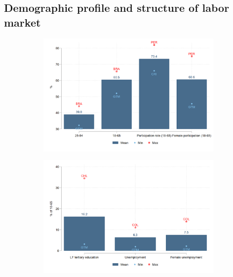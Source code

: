 \documentclass[english]{article}
\begin{document}
\subsection{Demographic profile and structure of labor market}
\begin{figure}[H]
                \justifying
                  \caption{Demographic profile and structure of labor market}
                \begin{subfigure}{.9\textwidth}
                      \centering
                      \includegraphics[width=1\linewidth]{latex/figures/Snapshot/Structure of labor market_a.png}
                      \label{fig:labmarket1}
                \end{subfigure}
        
                \begin{subfigure}{.9\textwidth}
                      \centering
                      \includegraphics[width=1\linewidth]{latex/figures/Snapshot/Structure of labor market_b.png}
                      \label{fig:labmarket2}
                \end{subfigure}
        

\end{figure}
\end{document}
